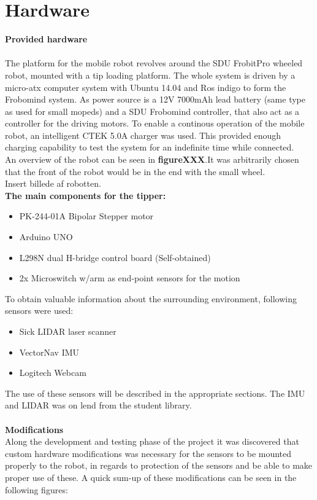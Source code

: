 \section{Hardware} %
\label{sec:mr_hardware}

\textbf{Provided hardware}
\\
\\
The platform for the mobile robot revolves around the SDU FrobitPro wheeled 
robot, mounted with a tip loading platform. The whole system is driven 
by a micro-atx computer system with Ubuntu 14.04 and Ros indigo to form the 
Frobomind system. As power source is a 12V 7000mAh lead battery (same type as 
used for 
small mopeds) and a SDU Frobomind controller, that also act as a controller for 
the driving motors. To enable a continous operation of the mobile robot, an 
intelligent CTEK 5.0A charger was used. This provided enough charging 
capability to test the system for an indefinite time while connected.\\ An 
overview of the robot can be seen in \textbf{figureXXX}.It was arbitrarily 
chosen that the front of the robot would be in the end with the small wheel.\\
Insert billede af robotten. \\
\textbf{The main components for the tipper:}
\begin{itemize}
	\item PK-244-01A Bipolar Stepper motor
	\item Arduino UNO
	\item L298N dual H-bridge control board (Self-obtained)
	\item 2x Microswitch w/arm as end-point sensors for the motion
\end{itemize}   

To obtain valuable information about the surrounding environment, following 
sensors were used:\\
\begin{itemize}
	\item Sick LIDAR laser scanner
	\item VectorNav	 IMU
	\item Logitech Webcam
\end{itemize} 

The use of these sensors will be described in the appropriate sections. The IMU 
and LIDAR was on lend from the student library.\\
\\
\textbf{Modifications}\\
Along the development and testing phase of the project it was discovered that 
custom hardware modifications was necessary for the sensors to be mounted 
properly to the robot, in regards to protection of the sensors and be able to 
make proper use of these. A quick sum-up of these modifications can be seen in 
the following figures:\\

